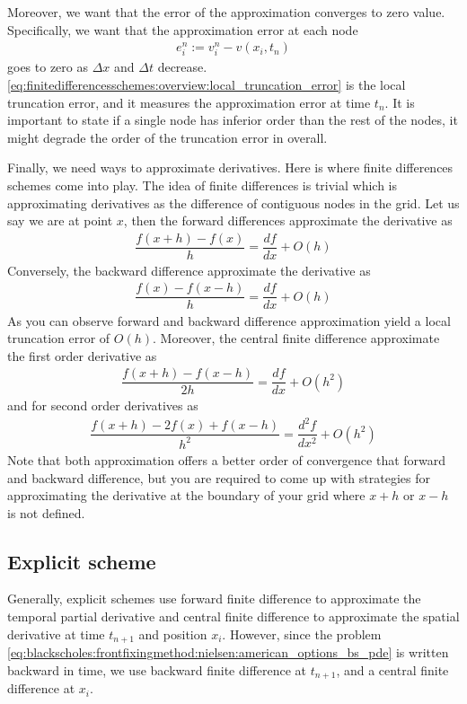 Moreover, we want that the error of the approximation converges to zero value. Specifically, we want that the approximation error at each node 
\begin{align}
  \label{eq:finitedifferencesschemes:overview:local_truncation_error}
  e^{n}_i := v^{n}_i-v(x_i, t_n)
\end{align}
goes to zero as $\Delta{x}$ and $\Delta{t}$ decrease. \eqref{eq:finitedifferencesschemes:overview:local_truncation_error} is the local truncation error, and it measures the approximation error at time $t_n$. It is important to state if a single node has inferior order than the rest of the nodes, it might degrade the order of the truncation error in overall.   

Finally, we need ways to approximate derivatives. Here is where finite differences schemes come into play. The idea of finite differences is trivial which is approximating derivatives as the difference of contiguous nodes in the grid. Let us say we are at point $x$, then the forward differences approximate the derivative as
\begin{align*}
 \dfrac{f(x + h) - f(x)}{h} = \dfrac{df}{dx} + O(h)
\end{align*}
Conversely, the backward difference approximate the derivative as 
\begin{align*}
  \dfrac{f(x) - f(x-h)}{h} = \dfrac{df}{dx} + O(h)
\end{align*}
As you can observe forward and backward difference approximation yield a local truncation error of $O(h)$. Moreover, the central finite difference approximate the first order derivative as 
\begin{align*}
  \dfrac{f(x+h) - f(x-h)}{2h} = \dfrac{df}{dx} + O(h^2)
 \end{align*}
and for second order derivatives as
\begin{align*}
  \dfrac{f(x+h) - 2f(x) + f(x-h)}{h^2} = \dfrac{d^2f}{dx^2} + O(h^2)
 \end{align*}
Note that both approximation offers a better order of convergence that forward and backward difference, but you are required to come up with strategies for approximating the derivative at the boundary of your grid where $x+h$ or $x-h$ is not defined.

\subsection{Explicit scheme}
Generally, explicit schemes use forward finite difference to approximate the temporal partial derivative and central finite difference to approximate the spatial derivative at time $t_{n+1}$ and position $x_i$. However, since the problem \eqref{eq:blackscholes:frontfixingmethod:nielsen:american_options_bs_pde} is written backward in time, we use backward finite difference at $t_{n+1}$, and a central finite difference at $x_i$.

